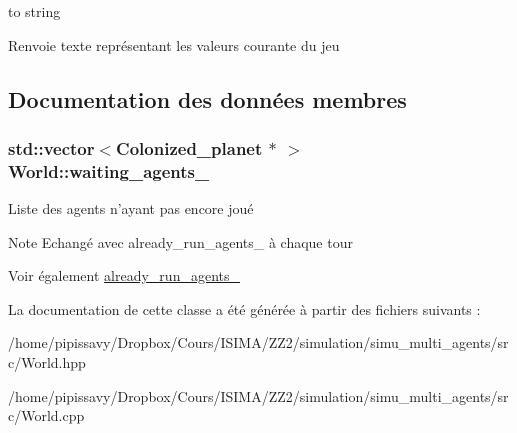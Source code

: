 to string 

\begin{DoxyReturn}{Renvoie}
texte représentant les valeurs courante du jeu 
\end{DoxyReturn}


\subsection{Documentation des données membres}
\hypertarget{classWorld_a732ce05c7e0012b98e2a8715b41d89fd}{
\subsubsection[{waiting\-\_\-agents\-\_\-}]{\setlength{\rightskip}{0pt plus 5cm}std\-::vector$<${\bf Colonized\-\_\-planet} $\ast$ $>$ World\-::waiting\-\_\-agents\-\_\-\hspace{0.3cm}{\ttfamily [private]}}}\label{classWorld_a732ce05c7e0012b98e2a8715b41d89fd}


Liste des agents n'ayant pas encore joué 

\begin{DoxyNote}{Note}
Echangé avec already\-\_\-run\-\_\-agents\-\_\- à chaque tour 
\end{DoxyNote}
\begin{DoxySeeAlso}{Voir également}
\hyperlink{classWorld_aafbe82365fac0f0d0e98c95d33a258f9}{already\-\_\-run\-\_\-agents\-\_\-} 
\end{DoxySeeAlso}


La documentation de cette classe a été générée à partir des fichiers suivants \-:\begin{DoxyCompactItemize}
\item 
/home/pipissavy/\-Dropbox/\-Cours/\-I\-S\-I\-M\-A/\-Z\-Z2/simulation/simu\-\_\-multi\-\_\-agents/src/World.\-hpp\item 
/home/pipissavy/\-Dropbox/\-Cours/\-I\-S\-I\-M\-A/\-Z\-Z2/simulation/simu\-\_\-multi\-\_\-agents/src/World.\-cpp\end{DoxyCompactItemize}
